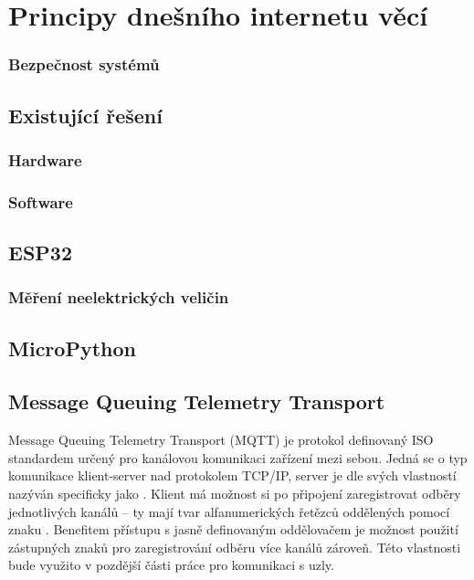 \chapter{Principy dnešního internetu věcí}
\label{ch:principy-iot}




\subsection{Bezpečnost systémů}


\section{Existující řešení}
\subsection{Hardware}

\subsection{Software}

\section{ESP32}

\subsection{Měření neelektrických veličin}

\section{MicroPython}

\section{Message Queuing Telemetry Transport}
Message Queuing Telemetry Transport (MQTT) je protokol definovaný ISO standardem určený pro kanálovou komunikaci zařízení
mezi sebou. Jedná se o typ komunikace klient-server nad protokolem TCP/IP, server je dle svých vlastností nazýván specificky
jako . Klient má možnost si po připojení zaregistrovat odběry jednotlivých kanálů -- ty mají tvar alfanumerických
řetězců oddělených pomocí znaku \uv{/}. Benefitem přístupu s jasně definovaným oddělovačem je možnost použití zástupných znaků pro
zaregistrování odběru více kanálů zároveň. Této vlastnosti bude využito v pozdější části práce pro komunikaci s uzly.

